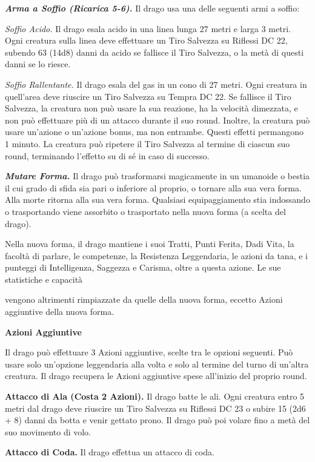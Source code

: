 \begin{multicols}{2}
\textit{\textbf{Arma a Soffio (Ricarica 5-6).}} Il drago usa una delle seguenti armi a soffio:

\textit{Soffio Acido.} Il drago esala acido in una linea lunga 27 metri e larga 3 metri. Ogni creatura sulla linea deve effettuare un Tiro Salvezza su Riflessi DC 22, subendo 63 (14d8) danni da acido se fallisce il Tiro Salvezza, o la metà di questi danni se lo riesce.

\textit{Soffio Rallentante.} Il drago esala del gas in un cono di 27 metri. Ogni creatura in quell'area deve riuscire un Tiro Salvezza su Tempra DC 22. Se fallisce il Tiro Salvezza, la creatura non può usare la sua reazione, ha la velocità dimezzata, e non può effettuare più di un attacco durante il suo round. Inoltre, la creatura può usare un'azione o un'azione bonus, ma non entrambe. Questi effetti permangono 1 minuto. La creatura può ripetere il Tiro Salvezza al termine di ciascun suo round, terminando l'effetto su di sé in caso di successo.

\textit{\textbf{Mutare Forma.}} Il drago può trasformarsi magicamente in un umanoide o bestia il cui grado di sfida sia pari o inferiore al proprio, o tornare alla sua vera forma. Alla morte ritorna alla sua vera forma. Qualsiasi equipaggiamento stia indossando o trasportando viene assorbito o trasportato nella nuova forma (a scelta del drago).

Nella nuova forma, il drago mantiene i suoi Tratti, Punti Ferita, Dadi Vita, la facoltà di parlare, le competenze, la Resistenza Leggendaria, le azioni da tana, e i punteggi di Intelligenza, Saggezza e Carisma, oltre a questa azione. Le sue statistiche e capacità

vengono altrimenti rimpiazzate da quelle della nuova forma, eccetto Azioni aggiuntive della nuova forma.

\textbf{Azioni Aggiuntive}

Il drago può effettuare 3 Azioni aggiuntive, scelte tra le opzioni seguenti. Può usare solo un'opzione leggendaria alla volta e solo al termine del turno di un'altra creatura. Il drago recupera le Azioni aggiuntive spese all'inizio del proprio round.

\textbf{Attacco di Ala (Costa 2 Azioni).} Il drago batte le ali. Ogni creatura entro 5 metri dal drago deve riuscire un Tiro Salvezza su Riflessi DC 23 o subire 15 (2d6 + 8) danni da botta e venir gettato prono. Il drago può poi volare fino a metà del suo movimento di volo.

\textbf{Attacco di Coda.} Il drago effettua un attacco di coda.


\end{multicols}
